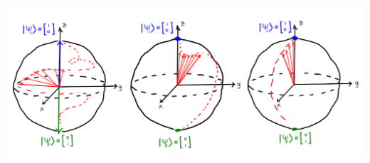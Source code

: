 \documentclass[12pt, a4paper]{report}
\newenvironment{Figure}
    {\par\medskip\noindent\minipage{\linewidth}}
    {\endminipage\par\medskip}
\newcommand\PT{\(\mathcal{PT}\)}
\begin{document}
\begin{Figure}
\centering
\includegraphics[width=\linewidth]{Bloch_spheres.pdf}
\label{fig:bloch}
\end{Figure}

\end{document}
